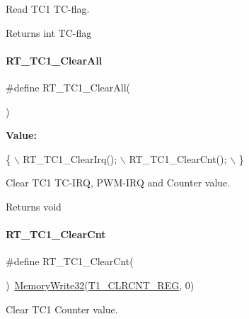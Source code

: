 Read T\+C1 T\+C-\/flag. 

\begin{DoxyReturn}{Returns}
int T\+C-\/flag 
\end{DoxyReturn}
\mbox{\label{a00044_a2a7757de241add69f5fffc4e1dfa431a}} 
\paragraph{\texorpdfstring{R\+T\+\_\+\+T\+C1\+\_\+\+Clear\+All}{RT\_TC1\_ClearAll}}
{\footnotesize\ttfamily \#define R\+T\+\_\+\+T\+C1\+\_\+\+Clear\+All(\begin{DoxyParamCaption}{ }\end{DoxyParamCaption})}

{\bfseries Value\+:}
\begin{DoxyCode}
\{                   \(\backslash\)
        RT\_TC1\_ClearIrq(); \(\backslash\)
        RT\_TC1\_ClearCnt(); \(\backslash\)
    \}
\end{DoxyCode}


Clear T\+C1 T\+C-\/\+I\+RQ, P\+W\+M-\/\+I\+RQ and Counter value. 

\begin{DoxyReturn}{Returns}
void 
\end{DoxyReturn}
\mbox{\label{a00044_abcd4f7c1a53b5d0a31f45076725a1ed6}} 
\paragraph{\texorpdfstring{R\+T\+\_\+\+T\+C1\+\_\+\+Clear\+Cnt}{RT\_TC1\_ClearCnt}}
{\footnotesize\ttfamily \#define R\+T\+\_\+\+T\+C1\+\_\+\+Clear\+Cnt(\begin{DoxyParamCaption}{ }\end{DoxyParamCaption})~\mbox{\hyperlink{a00020_a6b9732365b12e48ddb89fe1028b975b0}{Memory\+Write32}}(\mbox{\hyperlink{a00020_abb2cbf74aac1b5551218b38332137dd9}{T1\+\_\+\+C\+L\+R\+C\+N\+T\+\_\+\+R\+EG}}, 0)}



Clear T\+C1 Counter value. 

